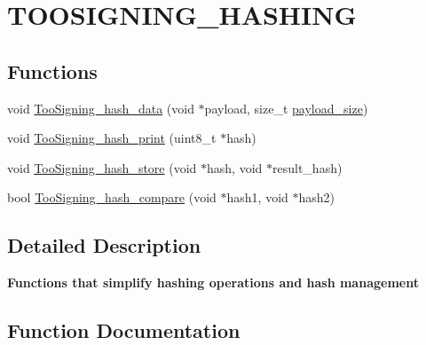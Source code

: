 \hypertarget{group__TOOSIGNING__HASHING}{}\section{T\+O\+O\+S\+I\+G\+N\+I\+N\+G\+\_\+\+H\+A\+S\+H\+I\+NG}
\label{group__TOOSIGNING__HASHING}
\subsection*{Functions}
\begin{DoxyCompactItemize}
\item 
void \hyperlink{group__TOOSIGNING__HASHING_gafb2935303b05255e80a7a6fa4be7cf57}{Too\+Signing\+\_\+hash\+\_\+data} (void $\ast$payload, size\+\_\+t \hyperlink{group__TOONETWORKING__SIMPLE__BUFFER_gaca16f9091ec66e37bff7fc67b75eba73}{payload\+\_\+size})
\item 
void \hyperlink{group__TOOSIGNING__HASHING_ga7696a20bc1d03d129afbdc8d6e446aa2}{Too\+Signing\+\_\+hash\+\_\+print} (uint8\+\_\+t $\ast$hash)
\item 
void \hyperlink{group__TOOSIGNING__HASHING_gae743dd1289d92f915352e40b047b4cc8}{Too\+Signing\+\_\+hash\+\_\+store} (void $\ast$hash, void $\ast$result\+\_\+hash)
\item 
bool \hyperlink{group__TOOSIGNING__HASHING_ga3a6687a23b6971e4053bef8328e347dd}{Too\+Signing\+\_\+hash\+\_\+compare} (void $\ast$hash1, void $\ast$hash2)
\end{DoxyCompactItemize}


\subsection{Detailed Description}
{\bfseries Functions that simplify hashing operations and hash management} 

\subsection{Function Documentation}
